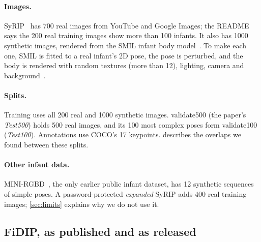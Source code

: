 \paragraph{Images.} SyRIP~\citep{huang2021fidip,syripdata} has 700 real images from YouTube and Google Images; the README says the 200 real training images show more than 100 infants.
It also has 1000 synthetic images, rendered from the SMIL infant body model~\citep{hesse2018smil}. To make each one, SMIL is fitted to a real infant's 2D pose, the pose is perturbed, and the body is rendered with random textures (more than 12), lighting, camera and background~\citep{huang2021fidip}.

\paragraph{Splits.} Training uses all 200 real and 1000 synthetic images. validate500 (the paper's \emph{Test500}) holds 500 real images, and its 100 most complex poses form validate100 (\emph{Test100}). Annotations use COCO's 17 keypoints.  describes the overlaps we found between these splits.

\paragraph{Other infant data.} MINI-RGBD~\citep{hesse2018minirgbd}, the only earlier public infant dataset, has 12 synthetic sequences of simple poses. A password-protected \emph{expanded} SyRIP adds 400 real training images; \cref{sec:limits} explains why we do not use it.

\subsection{FiDIP, as published and as released}\label{sec:fidip}

